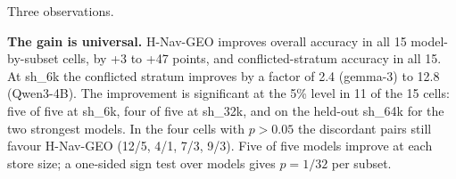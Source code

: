 \documentclass[journal=jcisd8,manuscript=article]{achemso}
\begin{document}
\begin{table}[H]\centering\small
\caption{sh\_32k (calibration split; $n=100$).}\label{tab:sh32k}
\end{table}

\begin{table}[H]\centering\small
\caption{sh\_64k (held out, one shot; $n=100$).}\label{tab:sh64k}
\end{table}

Three observations.

\textbf{The gain is universal.} H-Nav-GEO improves overall accuracy in all 15 model-by-subset cells, by +3 to +47 points, and conflicted-stratum accuracy in all 15. At sh\_6k the conflicted stratum improves by a factor of 2.4 (gemma-3) to 12.8 (Qwen3-4B). The improvement is significant at the 5\% level in 11 of the 15 cells: five of five at sh\_6k, four of five at sh\_32k, and on the held-out sh\_64k for the two strongest models. In the four cells with $p>0.05$ the discordant pairs still favour H-Nav-GEO (12/5, 4/1, 7/3, 9/3). Five of five models improve at each store size; a one-sided sign test over models gives $p=1/32$ per subset.
\end{document}
